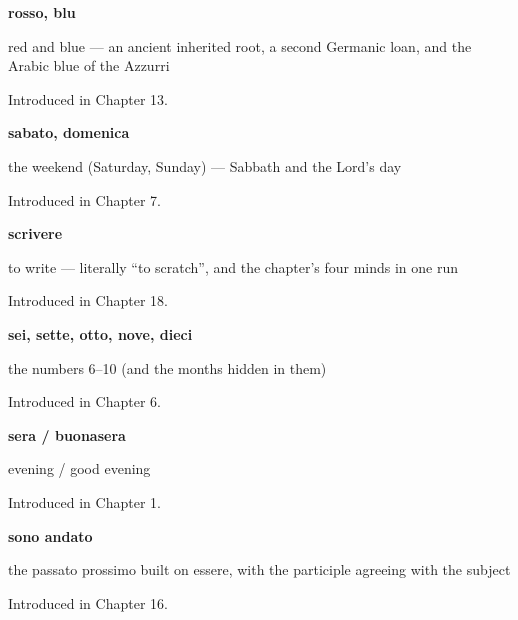 \noindent\begin{minipage}[t]{\linewidth}
\raggedright
\textbf{rosso, blu}\par
\small red and blue — an ancient inherited root, a second Germanic loan, and the Arabic blue of the Azzurri\par
\footnotesize Introduced in Chapter 13.
\end{minipage}\par\medskip

\noindent\begin{minipage}[t]{\linewidth}
\raggedright
\textbf{sabato, domenica}\par
\small the weekend (Saturday, Sunday) — Sabbath and the Lord's day\par
\footnotesize Introduced in Chapter 7.
\end{minipage}\par\medskip

\noindent\begin{minipage}[t]{\linewidth}
\raggedright
\textbf{scrivere}\par
\small to write — literally \textquotedblleft{}to scratch\textquotedblright{}, and the chapter's four minds in one run\par
\footnotesize Introduced in Chapter 18.
\end{minipage}\par\medskip

\noindent\begin{minipage}[t]{\linewidth}
\raggedright
\textbf{sei, sette, otto, nove, dieci}\par
\small the numbers 6–10 (and the months hidden in them)\par
\footnotesize Introduced in Chapter 6.
\end{minipage}\par\medskip

\noindent\begin{minipage}[t]{\linewidth}
\raggedright
\textbf{sera / buonasera}\par
\small evening / good evening\par
\footnotesize Introduced in Chapter 1.
\end{minipage}\par\medskip

\noindent\begin{minipage}[t]{\linewidth}
\raggedright
\textbf{sono andato}\par
\small the passato prossimo built on essere, with the participle agreeing with the subject\par
\footnotesize Introduced in Chapter 16.
\end{minipage}\par\medskip

